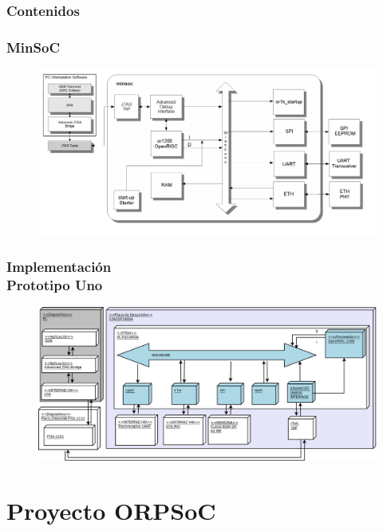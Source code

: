 \documentclass[xcolor=dvipsnames,mathserif,9pt]{beamer}
\begin{document}
 \begin{frame}
    \frametitle{Contenidos}
    \tableofcontents[currentsection]
  \end{frame}

\begin{frame} \frametitle{MinSoC}%
 \begin{figure}[!h]
      \centering
     \includegraphics[scale=0.09]{figuras/minsoc}
    \end{figure}
\end{frame}

\begin{frame} \frametitle{Implementación \\ \small Prototipo Uno}
 \begin{figure}[!h]
      \centering
     \includegraphics[scale=0.09]{figuras/proto1}
    \end{figure}
\end{frame}

\section{Proyecto ORPSoC}
\end{document}

